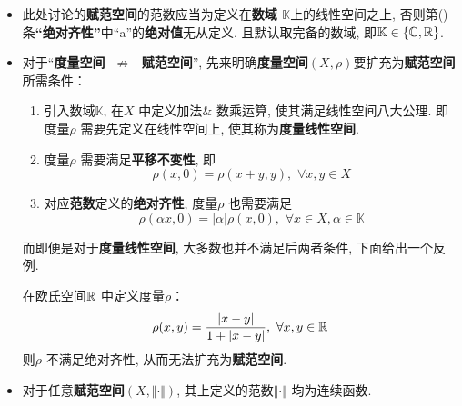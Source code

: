 \begin{defn}
\begin{rmk}
\begin{itemize}
				\newpage
				
				\item 此处讨论的\textbf{赋范空间}的范数应当为定义在\textbf{数域 $\mathbb{K}$}上的线性空间之上, 否则第()条\textbf{“绝对齐性”}中“a”的\textbf{绝对值}无从定义. 且默认取完备的数域, 即$\mathbb{K} \in \{ \mathbb{C} , \mathbb{R} \}$. 
				
				\vspace{2em}
				
				\item 对于“\textbf{度量空间} $\,\, \not\Rightarrow \,\,$ \textbf{赋范空间}”, 先来明确\textbf{度量空间$(X , \rho)$}要扩充为\textbf{赋范空间}所需条件：
				
				\vspace*{0.5em}
				
				\begin{enumerate}
					\item 引入数域$\mathbb{K}$, 在$X$ 中定义加法$\&$ 数乘运算, 使其满足线性空间八大公理. 即度量$\rho$ 需要先定义在线性空间上, 使其称为\textbf{度量线性空间}. 
					
					\vspace*{0.5em}
					
					\item 度量$\rho$ 需要满足\textbf{平移不变性}, 即
					\[ \rho(x , 0) = \rho(x + y , y) , \,\, \forall x , y \in X \]
					
					\item 对应\textbf{范数}定义的\textbf{绝对齐性}, 度量$\rho$ 也需要满足
					\[ \rho(\alpha x , 0) = \left| \alpha \right| \rho(x , 0) , \,\, \forall x \in X , \alpha \in \mathbb{K} \]
				\end{enumerate}
				
				\vspace*{0.5em}
				
				而即便是对于\textbf{度量线性空间}, 大多数也并不满足后两者条件, 下面给出一个反例.
				
				\begin{example}\label{ex 2.1.1}
					在欧氏空间$\mathbb{R}$ 中定义度量$\rho$：
					\[ \rho(x , y) = \frac{\left| x - y \right|}{1 + \left| x - y \right|} , \,\, \forall x , y \in \mathbb{R} \]
					则$\rho$ 不满足绝对齐性, 从而无法扩充为\textbf{赋范空间}.
				\end{example}
				
				\vspace*{4em}
				
				\item 对于任意\textbf{赋范空间}$(X , \Vert \cdot \Vert)$, 其上定义的范数$\Vert \cdot \Vert$ 均为连续函数.
				

\end{itemize}
\end{rmk}
\end{defn}
